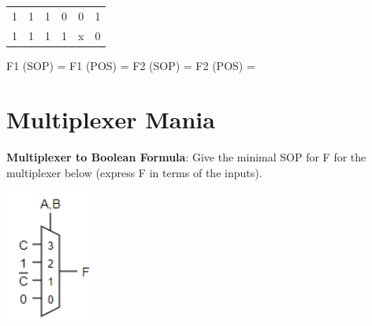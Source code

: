 \documentclass{article}
\begin{document}
\begin{enumerate}[label=(\alph*)]
\begin{multicols}{2}
\begin{center}
{\begin{tabular}{|c|c|c|c||c|c|}
            1 & 1 & 1 & 0 & 0 & 1 \\
            1 & 1 & 1 & 1 & x & 0 \\
            \hline
            \end{tabular}
        }
        \end{center}
        \columnbreak
        F1 (SOP) = 
        \newline
        \newline
        F1 (POS) = 
        \newline
        \newline
        F2 (SOP) = 
        \newline
        \newline
        F2 (POS) = 
        \newline
        \newline
        \end{multicols}
    \newpage
\end{enumerate}
\section{Multiplexer Mania}
    \textbf{Multiplexer to Boolean Formula}: Give the minimal SOP for F for the multiplexer below (express F in terms of the inputs).
    \newline
    \begin{multicols}{2}
    \begin{center}
    \includegraphics[width=3cm]{figures/Multiplexer.png}
    \end{center}
    \columnbreak
    \end{multicols}
\end{document}
